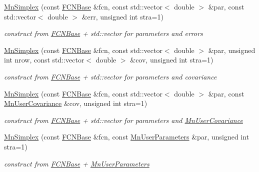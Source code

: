 \begin{DoxyCompactItemize}
\item 
\mbox{\hyperlink{classROOT_1_1Minuit2_1_1MnSimplex_abc4ddf29140ab0ada1e90afbc33359cf}{Mn\+Simplex}} (const \mbox{\hyperlink{classROOT_1_1Minuit2_1_1FCNBase}{F\+C\+N\+Base}} \&fcn, const std\+::vector$<$ double $>$ \&par, const std\+::vector$<$ double $>$ \&err, unsigned int stra=1)
\begin{DoxyCompactList}\small\item\em construct from \mbox{\hyperlink{classROOT_1_1Minuit2_1_1FCNBase}{F\+C\+N\+Base}} + std\+::vector for parameters and errors \end{DoxyCompactList}\item 
\mbox{\hyperlink{classROOT_1_1Minuit2_1_1MnSimplex_a7c7c4c6af82a37f75f574e80db9b4d08}{Mn\+Simplex}} (const \mbox{\hyperlink{classROOT_1_1Minuit2_1_1FCNBase}{F\+C\+N\+Base}} \&fcn, const std\+::vector$<$ double $>$ \&par, unsigned int nrow, const std\+::vector$<$ double $>$ \&cov, unsigned int stra=1)
\begin{DoxyCompactList}\small\item\em construct from \mbox{\hyperlink{classROOT_1_1Minuit2_1_1FCNBase}{F\+C\+N\+Base}} + std\+::vector for parameters and covariance \end{DoxyCompactList}\item 
\mbox{\hyperlink{classROOT_1_1Minuit2_1_1MnSimplex_ab97366c72fb0ab991cfcdaa6fb8dcb01}{Mn\+Simplex}} (const \mbox{\hyperlink{classROOT_1_1Minuit2_1_1FCNBase}{F\+C\+N\+Base}} \&fcn, const std\+::vector$<$ double $>$ \&par, const \mbox{\hyperlink{classROOT_1_1Minuit2_1_1MnUserCovariance}{Mn\+User\+Covariance}} \&cov, unsigned int stra=1)
\begin{DoxyCompactList}\small\item\em construct from \mbox{\hyperlink{classROOT_1_1Minuit2_1_1FCNBase}{F\+C\+N\+Base}} + std\+::vector for parameters and \mbox{\hyperlink{classROOT_1_1Minuit2_1_1MnUserCovariance}{Mn\+User\+Covariance}} \end{DoxyCompactList}\item 
\mbox{\hyperlink{classROOT_1_1Minuit2_1_1MnSimplex_ae306bac9f00c5b8d330ca4166620f75e}{Mn\+Simplex}} (const \mbox{\hyperlink{classROOT_1_1Minuit2_1_1FCNBase}{F\+C\+N\+Base}} \&fcn, const \mbox{\hyperlink{classROOT_1_1Minuit2_1_1MnUserParameters}{Mn\+User\+Parameters}} \&par, unsigned int stra=1)
\begin{DoxyCompactList}\small\item\em construct from \mbox{\hyperlink{classROOT_1_1Minuit2_1_1FCNBase}{F\+C\+N\+Base}} + \mbox{\hyperlink{classROOT_1_1Minuit2_1_1MnUserParameters}{Mn\+User\+Parameters}} \end{DoxyCompactList}\item 

\end{DoxyCompactItemize}
